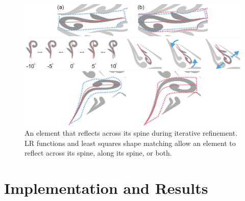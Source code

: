 \begin{figure}[h!]
\centering
\includegraphics[width=1.0\textwidth]{figures/flowpak/stretch.pdf}
\caption[Enlarge an element]
{\label{stretch_ornament}
(a) An element with its sub-region blob shown in dashed blue line. Note that any blob is constrained by the neighboring elements. 
(b) The dashed red line is the grown blob, which accommodates an enlarged element.}

\bigskip
\includegraphics[width=1.0\textwidth]{figures/flowpak/rotate_ornament.pdf}
\caption[Rotate an element]
{\label{rotate_ornament}
Top row: rotated versions of the original element. 
         The best rotation angle is chosen via least squares matching.
         Bottom row: original, rotated, and enlarged versions of an element.}
\bigskip

\includegraphics[width=1.0\textwidth]{figures/flowpak/flip.pdf}
\caption[Flip an element]
{\label{flip_shape}
An element that reflects across its spine during iterative refinement.
LR functions and least squares shape matching allow an element to reflect
across its spine, along its spine, or both.}
\end{figure}

\section{Implementation and Results}
\label{flowpak_implementation_and_results}


